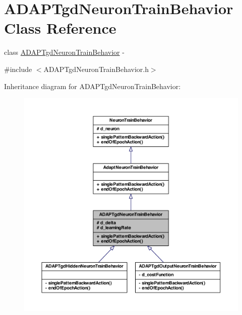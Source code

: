 \hypertarget{class_a_d_a_p_tgd_neuron_train_behavior}{
\section{ADAPTgdNeuronTrainBehavior Class Reference}
\label{class_a_d_a_p_tgd_neuron_train_behavior}
}


class \hyperlink{class_a_d_a_p_tgd_neuron_train_behavior}{ADAPTgdNeuronTrainBehavior} -\/  




{\ttfamily \#include $<$ADAPTgdNeuronTrainBehavior.h$>$}



Inheritance diagram for ADAPTgdNeuronTrainBehavior:
\nopagebreak
\begin{figure}[H]
\begin{center}
\leavevmode
\includegraphics[width=400pt]{class_a_d_a_p_tgd_neuron_train_behavior__inherit__graph}
\end{center}
\end{figure}


